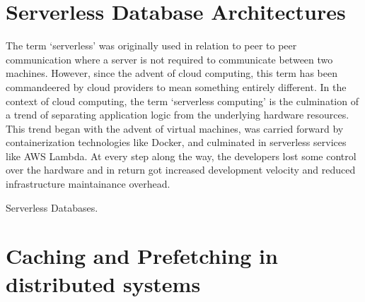 \section{Serverless Database Architectures}\label{sec:serverlessArch}
The term `serverless' was originally used in relation to peer to peer
communication where a server is not required to communicate between two
machines. However, since the advent of cloud computing, this term has been
commandeered by cloud providers to mean something entirely different. In the
context of cloud computing, the term `serverless computing' is the culmination 
of a trend of
separating application logic from the underlying hardware resources. This trend
began with the advent of virtual machines, was carried forward by
containerization technologies like Docker, and culminated in serverless services
like AWS Lambda. At every step along the way, the developers lost some control
over the hardware and in return got increased development velocity and reduced
infrastructure maintainance overhead.

\medskip
Serverless Databases.

 

\section{Caching and Prefetching in distributed systems}\label{sec:cachingDistSys}
